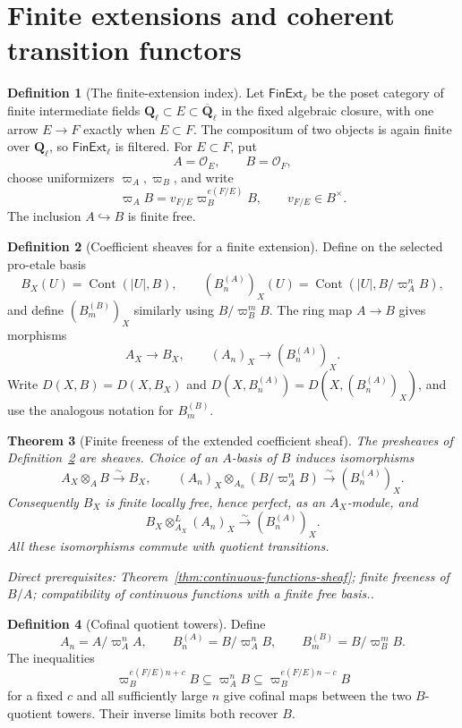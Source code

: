 \documentclass[10pt]{article}
\newtheorem{theorem}{Theorem}[section]
\theoremstyle{definition}
\newtheorem{definition}[theorem]{Definition}
\newcommand{\Ql}{\mathbf Q_\ell}
\newcommand{\Qlb}{\overline{\mathbf Q}_\ell}
\newcommand{\depends}[1]{\par\smallskip\noindent\textit{Direct prerequisites:} #1.}
\begin{document}
\section{Finite extensions and coherent transition functors}

\begin{definition}[The finite-extension index]
\label{def:finite-extension-index}
Let $\mathsf{FinExt}_\ell$ be the poset category of finite intermediate
fields $\Ql\subset E\subset\Qlb$ in the fixed algebraic closure, with one
arrow $E\to F$ exactly when $E\subset F$.  The compositum of two objects is
again finite over $\Ql$, so $\mathsf{FinExt}_\ell$ is filtered.  For
$E\subset F$, put
\[
 A=\mathcal O_E,\qquad B=\mathcal O_F,
\]
choose uniformizers $\varpi_A,\varpi_B$, and write
\[
 \varpi_A B=v_{F/E}\varpi_B^{e(F/E)}B,
 \qquad v_{F/E}\in B^\times.
\]
The inclusion $A\hookrightarrow B$ is finite free.
\end{definition}

\begin{definition}[Coefficient sheaves for a finite extension]
\label{def:extension-coefficient-sheaves}
Define on the selected pro-etale basis
\[
 B_X(U)=\operatorname{Cont}(|U|,B),
 \qquad
 (B_n^{(A)})_X(U)=
 \operatorname{Cont}(|U|,B/\varpi_A^nB),
\]
and define $(B_m^{(B)})_X$ similarly using $B/\varpi_B^mB$.  The ring map
$A\to B$ gives morphisms
\[
 A_X\longrightarrow B_X,
 \qquad
 (A_n)_X\longrightarrow(B_n^{(A)})_X.
\]
Write $D(X,B)=D(X,B_X)$ and
$D(X,B_n^{(A)})=D(X,(B_n^{(A)})_X)$, and use the analogous notation for
$B_m^{(B)}$.
\end{definition}

\begin{theorem}[Finite freeness of the extended coefficient sheaf]
\label{thm:extension-sheaf-finite-free}
The presheaves of
Definition~\ref{def:extension-coefficient-sheaves} are sheaves.  Choice of
an $A$-basis of $B$ induces isomorphisms
\[
 A_X\otimes_AB\xrightarrow{\sim}B_X,
 \qquad
 (A_n)_X\otimes_{A_n}(B/\varpi_A^nB)
 \xrightarrow{\sim}(B_n^{(A)})_X.
\]
Consequently $B_X$ is finite locally free, hence perfect, as an
$A_X$-module, and
\[
 B_X\otimes^L_{A_X}(A_n)_X
 \xrightarrow{\sim}(B_n^{(A)})_X.
\]
All these isomorphisms commute with quotient transitions.
\depends{Theorem~\ref{thm:continuous-functions-sheaf}; finite freeness of
$B/A$; compatibility of continuous functions with a finite free basis.}
\end{theorem}

\begin{definition}[Cofinal quotient towers]\label{def:cofinal-towers}
Define
\[
 A_n=A/\varpi_A^nA,
 \qquad B_n^{(A)}=B/\varpi_A^nB,
 \qquad B_m^{(B)}=B/\varpi_B^mB.
\]
The inequalities
\[
 \varpi_B^{e(F/E)n+c}B\subseteq\varpi_A^nB
 \subseteq\varpi_B^{e(F/E)n-c}B
\]
for a fixed $c$ and all sufficiently large $n$ give cofinal maps between
the two $B$-quotient towers.  Their inverse limits both recover $B$.
\end{definition}
\end{document}
